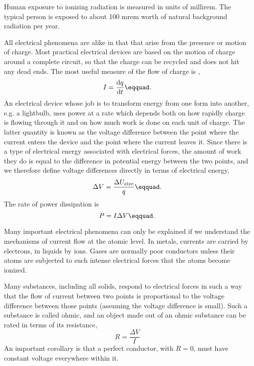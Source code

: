 	Human exposure to ionizing radiation is measured in units of
	millirem. The typical person is exposed to about 100 mrem
	worth of natural background radiation per year.

	All electrical phenomena are alike in that that arise from
	the presence or motion of charge. Most practical electrical
	devices are based on the motion of charge around a complete
	circuit, so that the charge can be recycled and does not hit
	any dead ends. The most useful measure of the flow of charge
	is , 
	\begin{equation*}
		I=\frac{\der q}{\der t}\eqquad.
	\end{equation*}
	An electrical device whose job is to transform energy from
	one form into another, e.g. a lightbulb, uses power at a
	rate which depends both on how rapidly charge is flowing
	through it and on how much work is done on each unit of
	charge. The latter quantity is known as the voltage
	difference between the point where the current enters the
	device and the point where the current leaves it. Since
	there is a type of electrical energy associated with
	electrical forces, the amount of work they do is equal to
	the difference in potential energy between the two points,
	and we therefore define voltage differences directly in
	terms of electrical energy,
	\begin{equation*}
		 \Delta V=\frac{\Delta U_{elec}}{q}\eqquad.
	\end{equation*}
	 The rate of power dissipation is
	\begin{equation*}
		P = I\Delta V\eqquad.
	\end{equation*}
	
	Many important electrical phenomena can only be explained if
	we understand the mechanisms of current flow at the atomic
	level. In metals, currents are carried by electrons, in
	liquids by ions. Gases are normally poor conductors unless
	their atoms are subjected to such intense electrical forces
	that the atoms become ionized.
	
	Many substances, including all solids, respond to electrical
	forces in such a way that the flow of current between two
	points is proportional to the voltage difference between
	those points (assuming the voltage difference is small).
	Such a substance is called ohmic, and an
	object made out of an ohmic substance can be rated in terms
	of its resistance, 
	\begin{equation*}
		R = \frac{\Delta V}{I}
	\end{equation*}
	An important corollary is
	that a perfect conductor, with $R=0$, must have constant
	voltage everywhere within it.
	
